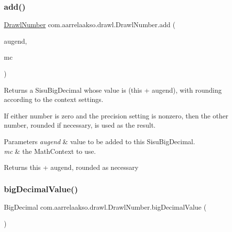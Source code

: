 \subsubsection{\texorpdfstring{add()}{add()}\hspace{0.1cm}{\footnotesize\ttfamily [3/3]}}
{\footnotesize\ttfamily \hyperlink{classcom_1_1aarrelaakso_1_1drawl_1_1_drawl_number}{Drawl\+Number} com.\+aarrelaakso.\+drawl.\+Drawl\+Number.\+add (\begin{DoxyParamCaption}\item[{@Not\+Null \hyperlink{classcom_1_1aarrelaakso_1_1drawl_1_1_drawl_number}{Drawl\+Number}}]{augend,  }\item[{Math\+Context}]{mc }\end{DoxyParamCaption})\hspace{0.3cm}{\ttfamily [protected]}}



Returns a Sisu\+Big\+Decimal whose value is (this + augend), with rounding according to the context settings. 

If either number is zero and the precision setting is nonzero, then the other number, rounded if necessary, is used as the result.


\begin{DoxyParams}{Parameters}
{\em augend} & value to be added to this Sisu\+Big\+Decimal. \\
\hline
{\em mc} & the Math\+Context to use. \\
\hline
\end{DoxyParams}
\begin{DoxyReturn}{Returns}
this + augend, rounded as necessary 
\end{DoxyReturn}
\mbox{\label{classcom_1_1aarrelaakso_1_1drawl_1_1_drawl_number_acf97abc572acd173a4d8cd6c5b5c2ecd}} 
\subsubsection{\texorpdfstring{big\+Decimal\+Value()}{bigDecimalValue()}}
{\footnotesize\ttfamily Big\+Decimal com.\+aarrelaakso.\+drawl.\+Drawl\+Number.\+big\+Decimal\+Value (\begin{DoxyParamCaption}{ }\end{DoxyParamCaption})\hspace{0.3cm}{\ttfamily [protected]}}



